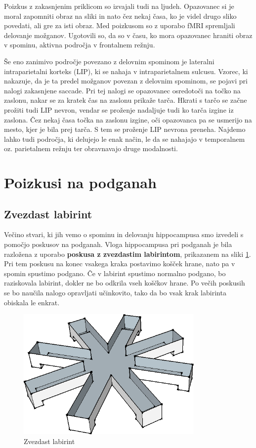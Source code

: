 \documentclass[10pt,a4paper]{article}
\begin{document}
Poizkus z zakasnjenim priklicom so izvajali tudi na ljudeh. Opazovanec si je moral zapomniti obraz na sliki in nato čez nekaj časa, ko je videl drugo sliko povedati, ali gre za isti obraz. Med poizkusom so z uporabo fMRI spremljali delovanje možganov. Ugotovili so, da so v času, ko mora opazovanec hraniti obraz v spominu, aktivna področja v frontalnem režnju.

Še eno zanimivo področje povezano z delovnim spominom je lateralni intraparietalni korteks (LIP), ki se nahaja v intraparietalnem sulcusu. Vzorec, ki nakazuje, da je ta predel možganov povezan z delovnim spominom, se pojavi pri nalogi zakasnjene saccade. Pri tej nalogi se opazovanec osredotoči na točko na zaslonu, nakar se za kratek čas na zaslonu prikaže tarča. Hkrati s tarčo se začne prožiti tudi LIP nevron, vendar se proženje nadaljuje tudi ko tarča izgine iz zaslona. Čez nekaj časa točka na zaslonu izgine, oči opazovanca pa se usmerijo na mesto, kjer je bila prej tarča. S tem se proženje LIP nevrona preneha. Najdemo lahko tudi področja, ki delujejo le enak način, le da se nahajajo v temporalnem oz. parietalnem režnju ter obravnavajo druge modalnosti.

\section{Poizkusi na podganah}
\subsection{Zvezdast labirint}
Večino stvari, ki jih vemo o spominu in delovanju hippocampusa smo izvedeli s pomočjo poskusov na podganah. Vloga hippocampusa pri podganah je bila razložena z uporabo \textbf{poskusa z zvezdastim labirintom}, prikazanem na sliki \ref{slikaLabirinta}. Pri tem poskusu na konec vsakega kraka postavimo košček hrane, nato pa v spomin spustimo podgano. Če v labirint spustimo normalno podgano, bo raziskovala labirint, dokler ne bo odkrila vseh koščkov hrane. Po večih poskusih se bo naučila nalogo opravljati učinkovito, tako da bo vsak krak labirinta obiskala le enkrat.

\begin{figure}[h]
  \centering
    \includegraphics[width=.5\textwidth]{Labirint.png}
  \caption{Zvezdast labirint}
  \label{slikaLabirinta}
\end{figure}
\end{document}
